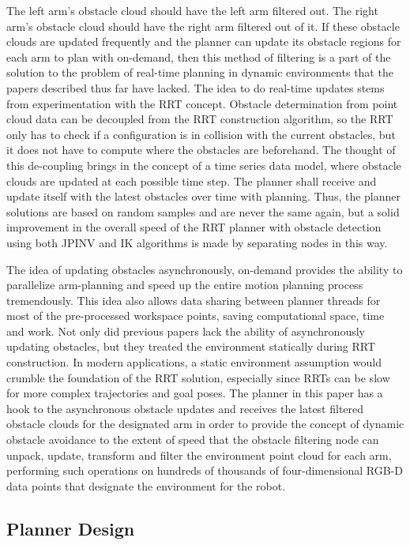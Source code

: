 \documentclass[conference]{IEEEtran} \usepackage[T1]{fontenc} \usepackage[backend=biber, style=ieee]{biblatex}
\begin{document}
The left arm's obstacle cloud should have the left arm filtered out. The right arm's obstacle cloud should have the right arm filtered out of it. If these obstacle
clouds are updated frequently and the planner can update its obstacle regions for each arm to plan with on-demand, then this method of filtering is a part of the solution
to the problem of real-time planning in dynamic environments that the papers described thus far have lacked. The idea to do real-time updates stems from experimentation
with the RRT concept. Obstacle determination from point cloud data can be decoupled from the RRT construction algorithm, so the RRT only has to check if a configuration is in 
collision with the current obstacles, but it does not have to compute where the obstacles are beforehand. The thought of this de-coupling brings in the concept of a time series 
data model, where obstacle clouds are updated at each possible time step. The planner shall receive and update itself with the latest obstacles over time with planning. Thus, the 
planner solutions are based on random samples and are never the same again, but a solid improvement in the overall speed of the RRT planner with obstacle detection using both JPINV 
and IK algorithms is made by separating nodes in this way.

The idea of updating obstacles asynchronously, on-demand provides the ability to parallelize arm-planning and speed up the entire motion planning process tremendously.
This idea also allows data sharing between planner threads for most of the pre-processed workspace points, saving computational space, time and work. Not only did previous papers 
lack the ability of asynchronously updating obstacles, but they treated the environment statically during RRT construction. In modern applications, a static environment
assumption would crumble the foundation of the RRT solution, especially since RRTs can be slow for more complex trajectories and goal poses. The planner in this paper
has a hook to the asynchronous obstacle updates and receives the latest filtered obstacle clouds for the designated arm in order to provide the concept of dynamic 
obstacle avoidance to the extent of speed that the obstacle filtering node can unpack, update, transform and filter the environment point cloud for each arm, 
performing such operations on hundreds of thousands of four-dimensional RGB-D data points that designate the environment for the robot.
 
\subsection{Planner Design}
\end{document}
